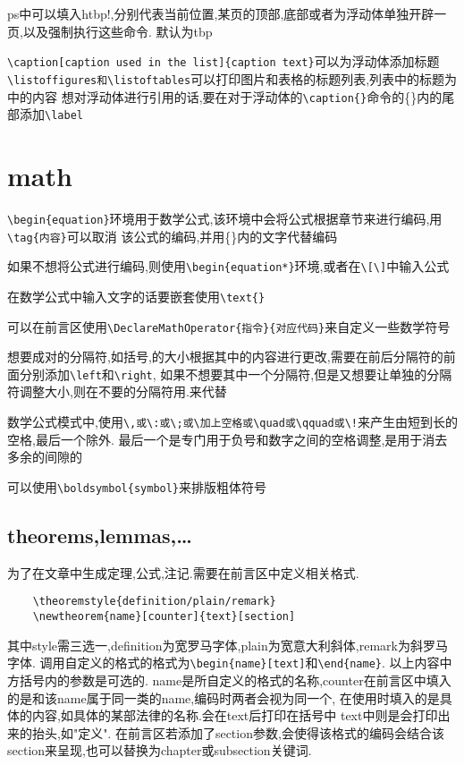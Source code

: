 \documentclass[a4paper,11pt]{article}%
\begin{document}
ps中可以填入htbp!,分别代表当前位置,某页的顶部,底部或者为浮动体单独开辟一页,以及强制执行这些命令.
默认为tbp

\verb+\caption[caption used in the list]{caption text}+可以为浮动体添加标题
\verb+\listoffigures和\listoftables+可以打印图片和表格的标题列表,列表中的标题为\[\]中的内容
想对浮动体进行引用的话,要在对于浮动体的\verb+\caption{}+命令的\{\}内的尾部添加\verb+\label+
\section{math}
\verb+\begin{equation}+环境用于数学公式,该环境中会将公式根据章节来进行编码,用\verb+\tag{内容}+可以取消
    该公式的编码,并用\{\}内的文字代替编码

    如果不想将公式进行编码,则使用\verb+\begin{equation*}+环境,或者在\verb+\[\]+中输入公式

在数学公式中输入文字的话要嵌套使用\verb+\text{}+

可以在前言区使用\verb+\DeclareMathOperator{指令}{对应代码}+来自定义一些数学符号

想要成对的分隔符,如括号,的大小根据其中的内容进行更改,需要在前后分隔符的前面分别添加\verb+\left+和\verb+\right+,
如果不想要其中一个分隔符,但是又想要让单独的分隔符调整大小,则在不要的分隔符用.来代替

数学公式模式中,使用\verb+\,或\:或\;或\加上空格或\quad或\qquad或\!+来产生由短到长的空格,最后一个除外.
最后一个是专门用于负号和数字之间的空格调整,是用于消去多余的间隙的

可以使用\verb+\boldsymbol{symbol}+来排版粗体符号

\subsection{theorems,lemmas,\ldots}
为了在文章中生成定理,公式,注记.需要在前言区中定义相关格式.
\begin{verbatim}
    \theoremstyle{definition/plain/remark} 
    \newtheorem{name}[counter]{text}[section]
\end{verbatim}
其中style需三选一,definition为宽罗马字体,plain为宽意大利斜体,remark为斜罗马字体.
调用自定义的格式的格式为\verb+\begin{name}[text]+和\verb+\end{name}+.
以上内容中方括号内的参数是可选的.
name是所自定义的格式的名称,counter在前言区中填入的是和该name属于同一类的name,编码时两者会视为同一个,
在使用时填入的是具体的内容,如具体的某部法律的名称.会在text后打印在括号中
text中则是会打印出来的抬头,如"定义".
在前言区若添加了section参数,会使得该格式的编码会结合该section来呈现,也可以替换为chapter或subsection关键词.
\end{document}

